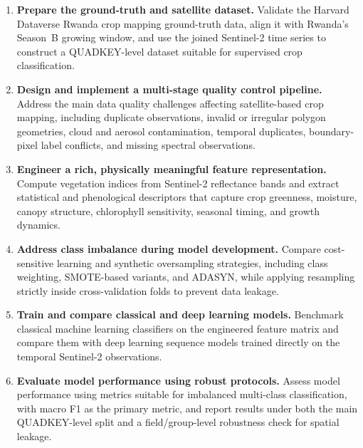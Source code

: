 \begin{enumerate}

    \item \textbf{Prepare the ground-truth and satellite dataset.}
    Validate the Harvard Dataverse Rwanda crop mapping ground-truth data,
    align it with Rwanda's Season~B growing window, and use the joined
    Sentinel-2 time series to construct a QUADKEY-level dataset suitable for
    supervised crop classification.

    \item \textbf{Design and implement a multi-stage quality control pipeline.}
    Address the main data quality challenges affecting satellite-based crop
    mapping, including duplicate observations, invalid or irregular polygon
    geometries, cloud and aerosol contamination, temporal duplicates,
    boundary-pixel label conflicts, and missing spectral observations.

    \item \textbf{Engineer a rich, physically meaningful feature representation.}
    Compute vegetation indices from Sentinel-2 reflectance bands and extract
    statistical and phenological descriptors that capture crop greenness,
    moisture, canopy structure, chlorophyll sensitivity, seasonal timing, and
    growth dynamics.

    \item \textbf{Address class imbalance during model development.}
    Compare cost-sensitive learning and synthetic oversampling strategies,
    including class weighting, SMOTE-based variants, and ADASYN, while applying
    resampling strictly inside cross-validation folds to prevent data leakage.

    \item \textbf{Train and compare classical and deep learning models.}
    Benchmark classical machine learning classifiers on the engineered feature
    matrix and compare them with deep learning sequence models trained directly
    on the temporal Sentinel-2 observations.

    \item \textbf{Evaluate model performance using robust protocols.}
    Assess model performance using metrics suitable for imbalanced
    multi-class classification, with macro F1 as the primary metric, and report
    results under both the main QUADKEY-level split and a field/group-level
    robustness check for spatial leakage.

\end{enumerate}


